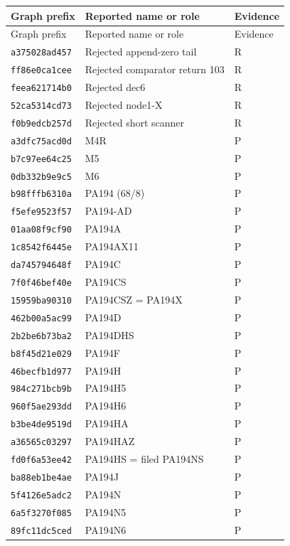 \small\begin{longtable}{@{}p{2.3cm}p{7.8cm}p{2.25cm}@{}}
\toprule Graph prefix & Reported name or role & Evidence\\\midrule\endfirsthead
\toprule Graph prefix & Reported name or role & Evidence\\\midrule\endhead
\bottomrule\endfoot
\texttt{a375028ad457} & Rejected append-zero tail & R\\
\texttt{ff86e0ca1cee} & Rejected comparator return 103 & R\\
\texttt{feea621714b0} & Rejected dec6 & R\\
\texttt{52ca5314cd73} & Rejected node1-X & R\\
\texttt{f0b9edcb257d} & Rejected short scanner & R\\
\texttt{a3dfc75acd0d} & M4R & P\\
\texttt{b7c97ee64c25} & M5 & P\\
\texttt{0db332b9e9c5} & M6 & P\\
\texttt{b98fffb6310a} & PA194 (68/8) & P\\
\texttt{f5efe9523f57} & PA194-AD & P\\
\texttt{01aa08f9cf90} & PA194A & P\\
\texttt{1c8542f6445e} & PA194AX11 & P\\
\texttt{da745794648f} & PA194C & P\\
\texttt{7f0f46bef40e} & PA194CS & P\\
\texttt{15959ba90310} & PA194CSZ = PA194X & P\\
\texttt{462b00a5ac99} & PA194D & P\\
\texttt{2b2be6b73ba2} & PA194DHS & P\\
\texttt{b8f45d21e029} & PA194F & P\\
\texttt{46becfb1d977} & PA194H & P\\
\texttt{984c271bcb9b} & PA194H5 & P\\
\texttt{960f5ae293dd} & PA194H6 & P\\
\texttt{b3be4de9519d} & PA194HA & P\\
\texttt{a36565c03297} & PA194HAZ & P\\
\texttt{fd0f6a53ee42} & PA194HS = filed PA194NS & P\\
\texttt{ba88eb1be4ae} & PA194J & P\\
\texttt{5f4126e5adc2} & PA194N & P\\
\texttt{6a5f3270f085} & PA194N5 & P\\
\texttt{89fc11dc5ced} & PA194N6 & P\\

\end{longtable}
